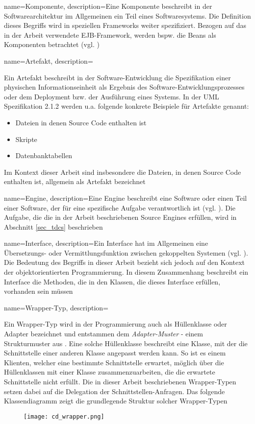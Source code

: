 

{
    name=Komponente,
    description={Eine Komponente beschreibt in der Softwarearchitektur im Allgemeinen ein Teil eines Softwaresystems. Die Definition dieses Begriffs wird in speziellen Frameworks weiter spezifiziert. Bezogen auf das in der Arbeit verwendete EJB-Framework, werden bspw. die Beans als Komponenten betrachtet (vgl. \cite{ejbspec})}
}
{
    name=Artefakt,
    description={Ein Artefakt beschreibt in der Software-Entwicklung die Spezifikation einer physischen Informationseinheit als Ergebnis des Software-Entwicklungsprozesses oder dem Deployment bzw. der Ausführung eines Systems. In der UML Spezifikation 2.1.2 \cite{uml} werden u.a. folgende konkrete Beispiele für Artefakte genannt:
    \begin{itemize}
    \item Dateien in denen Source Code enthalten ist
    \item Skripte
    \item Datenbanktabellen    
    \end{itemize}
    \noindent
    Im Kontext dieser Arbeit sind insbesondere die Dateien, in denen Source Code enthalten ist, allgemein als Artefakt bezeichnet}
}


{
    name=Engine,
    description={Eine Engine beschreibt eine Software oder einen Teil einer Software, der für eine spezifische Aufgabe verantwortlich ist (vgl. \cite{pcmag}). Die Aufgabe, die die in der Arbeit beschriebenen Source Engines erfüllen, wird in Abschnitt \ref{sec_tdcs} beschrieben}
}


{
    name=Interface,
    description={Ein Interface hat im Allgemeinen eine Übersetzungs- oder Vermittlungsfunktion zwischen gekoppelten Systemen (vgl. \cite{interfaces}). Die Bedeutung des Begriffs in dieser Arbeit bezieht sich jedoch auf den Kontext der objektorientierten Programmierung. In diesem Zusammenhang beschreibt ein Interface die Methoden, die in den Klassen, die dieses Interface erfüllen, vorhanden sein müssen}
}


{
    name=Wrapper-Typ,
    description={Ein Wrapper-Typ wird in der Programmierung auch als Hüllenklasse oder Adapter bezeichnet und entstammen dem \emph{Adapter-Muster} - einem Strukturmuster aus \cite{gof}. Eine solche Hüllenklasse beschreibt eine Klasse, mit der die Schnittstelle einer anderen Klasse angepasst werden kann. So ist es einem Klienten, welcher eine bestimmte Schnittstelle erwartet, möglich über die Hüllenklassen mit einer Klasse zusammenzuarbeiten, die die erwartete Schnittstelle nicht erfüllt. Die in dieser Arbeit beschriebenen Wrapper-Typen setzen dabei auf die Delegation der Schnittstellen-Anfragen. Das folgende Klassendiagramm zeigt die grundlegende Struktur solcher Wrapper-Typen
\begin{figure}[!h]
\centering
\texttt{[image: cd\_wrapper.png]}
\label{bild}
\end{figure} 
    }
}

